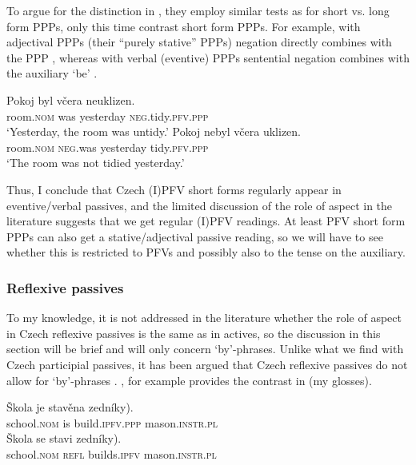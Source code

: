 \documentclass[output=paper,colorlinks,citecolor=brown]{langscibook}
\begin{document}
\noindent To argue for the distinction in , they employ similar tests as \citet{veselovskakarlik} for short vs. long form PPPs, only this time \citet{cahamedova20} contrast short form PPPs. For example, with adjectival PPPs (their ``purely stative'' PPPs) negation directly combines with the PPP , whereas with verbal (eventive) PPPs sentential negation combines with the auxiliary `be'  \citep[both examples adapted from][120]{cahamedova20}.

\ea\label{ex:ne}
\ea\label{ex:neukl}
\gll Pokoj byl včera neuklizen.\\
	room.\textsc{nom} was yesterday \textsc{neg}.tidy.\textsc{pfv.ppp}\\
\glt	`Yesterday, the room was untidy.'
\ex\label{ex:nebyl}
\gll Pokoj nebyl včera uklizen.\\
	room.\textsc{nom}  \textsc{neg}.was yesterday tidy.\textsc{pfv.ppp}\\
\glt	`The room was not tidied yesterday.'
\z 
\z 

\noindent Thus, I conclude that Czech (I)PFV short forms regularly appear in eventive/ver\-bal passives, and the limited discussion of the role of aspect in the literature suggests that we get regular (I)PFV readings. At least PFV short form PPPs can also get a stative/adjectival passive reading, so we will have to see whether this is restricted to PFVs and possibly also to the tense on the auxiliary. 

\subsubsection{Reflexive passives}

To my knowledge, it is not addressed in the literature whether the role of aspect in Czech reflexive passives is the same as in actives, so the discussion in this section will be brief and will only concern `by'-phrases. Unlike what we find with Czech participial passives, it has been argued that Czech reflexive passives do not allow for `by'-phrases \citep[e.g.][]{fehrmann+10,karlik17}. \citet{karlik17}, for example provides the contrast in  (my glosses).


\ea \label{ex:karlikby}
\ea
\gll Škola je stavěna \minsp{(} zedníky).\\
	school.\textsc{nom} is build.\textsc{ipfv.ppp} {} mason.\textsc{instr.pl}\\
\ex
\gll Škola se stavi \minsp{(*} zedníky).\\
	school.\textsc{nom} \textsc{refl} builds.\textsc{ipfv} {} mason.\textsc{instr.pl}\\
\z 
\z 
\end{document}
